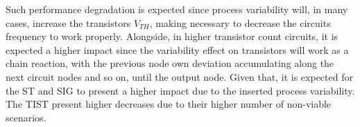 \documentclass[pgmicro,mestrado,english]{iiufrgs}
\begin{document}
Such performance degradation is expected since process variability will, in many cases, increase the transistors $V_{TH}$, making necessary to decrease the circuits frequency to work properly. Alongside, in higher transistor count circuits, it is expected a higher impact since the variability effect on transistors will work as a chain reaction, with the previous node own deviation accumulating along the next circuit nodes and so on, until the output node. Given that, it is expected for the ST and SIG to present a higher impact due to the inserted process variability. The TIST present higher decreases due to their higher number of non-viable scenarios.  %
    
\end{document}
